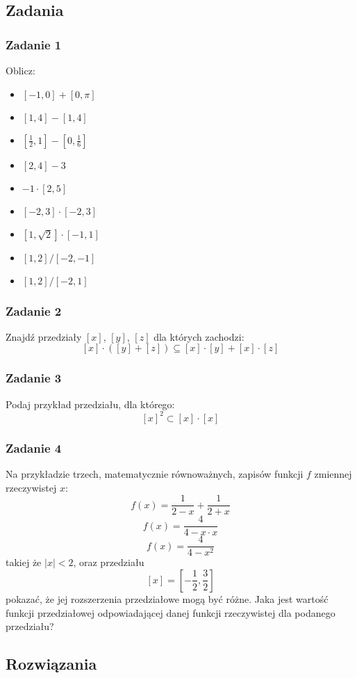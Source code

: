 \documentclass[a4paper]{article}
\begin{document}
\subsection{Zadania}
\subsubsection*{Zadanie 1}
Oblicz:
\begin{itemize}
\item $[-1,0]+[0,\pi]$
\item $[1,4]-[1,4]$
\item $[\frac{1}{2}, 1]-[0,\frac{1}{6}]$
\item $[2,4] - 3$
\item $-1\cdot[2,5]$
\item $[-2,3]\cdot[-2,3]$
\item $[1,\sqrt{2}]\cdot[-1,1]$
\item $[1,2]/[-2,-1]$
\item $[1,2]/[-2,1]$
\end{itemize}

\subsubsection*{Zadanie 2}
Znajdź przedziały $[x]$, $[y]$, $[z]$ dla których zachodzi:
$$ [x]\cdot([y]+[z]) \subseteq [x]\cdot[y] + [x]\cdot[z] $$

\subsubsection*{Zadanie 3}
Podaj przykład przedziału, dla którego: 
$$[x]^2 \subset [x]\cdot[x]$$

\subsubsection*{Zadanie 4}
Na przykładzie trzech, matematycznie równoważnych, zapisów funkcji $f$ zmiennej rzeczywistej $x$:
$$f(x) = \frac{1}{2-x}+\frac{1}{2+x}$$
$$f(x) = \frac{4}{4-x\cdot x}$$
$$f(x) = \frac{4}{4-x^2}$$
takiej że $|x|<2$, oraz przedziału
$$[x]=\left[-\frac{1}{2},\frac{3}{2}\right]$$
pokazać, że jej rozszerzenia przedziałowe mogą być różne. Jaka jest wartość funkcji przedziałowej odpowiadającej danej funkcji rzeczywistej dla podanego przedziału?

\subsection{Rozwiązania}
\end{document}
